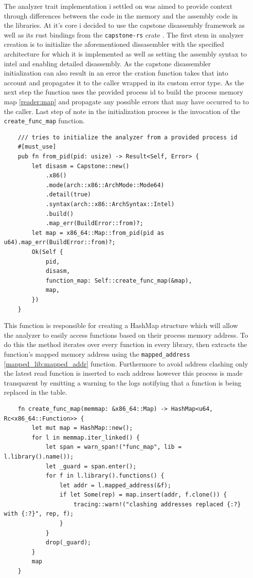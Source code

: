 The analyzer trait implementation i settled on was aimed to provide context through differences between the code in the memory and the assembly code in the libraries.
At it's core i decided to use the capstone \cite{} disassembly framework as well as its rust bindings from the \verb|capstone-rs| crate \cite{finkenauer_capstone-rustcapstone-rs_nodate}.
The first stem in analyzer creation is to initialize the aforementioned dissasembler with the specified architecture for which it is implemented as well as setting the assembly syntax to intel and enabling detailed disassembly.
As the capstone disassembler initialization can also result in an error the cration function takes that into account and propagates it to the caller wrapped in its custom error type.
As the next step the function uses the provided process id to build the process memory map \ref{reader:map} and propagate any possible errors that may have occurred to to the caller.
Last step of note in the initialization process is the invocation of the \verb|create_func_map| function.

\begin{lstlisting}
    /// tries to initialize the analyzer from a provided process id
    #[must_use]
    pub fn from_pid(pid: usize) -> Result<Self, Error> {
        let disasm = Capstone::new()
            .x86()
            .mode(arch::x86::ArchMode::Mode64)
            .detail(true)
            .syntax(arch::x86::ArchSyntax::Intel)
            .build()
            .map_err(BuildError::from)?;
        let map = x86_64::Map::from_pid(pid as u64).map_err(BuildError::from)?;
        Ok(Self {
            pid,
            disasm,
            function_map: Self::create_func_map(&map),
            map,
        })
    }
\end{lstlisting}

This function is responsible for creating a HashMap structure which will allow the analyzer to easily access functions based on their process memory address.
To do this the method iterates over every function in every library, then extracts the function's mapped memory address using the \verb|mapped_address| \ref{mapped_lib:mapped_addr} function.
Furthermore to avoid address clashing only the latest read function is inserted to each address however this process is made transparent by emitting a warning to the logs notifying that a function is being replaced in the table.

\begin{lstlisting}
    fn create_func_map(memmap: &x86_64::Map) -> HashMap<u64, Rc<x86_64::Function>> {
        let mut map = HashMap::new();
        for l in memmap.iter_linked() {
            let span = warn_span!("func_map", lib = l.library().name());
            let _guard = span.enter();
            for f in l.library().functions() {
                let addr = l.mapped_address(&f);
                if let Some(rep) = map.insert(addr, f.clone()) {
                    tracing::warn!("clashing addresses replaced {:?} with {:?}", rep, f);
                }
            }
            drop(_guard);
        }
        map
    }
\end{lstlisting}

